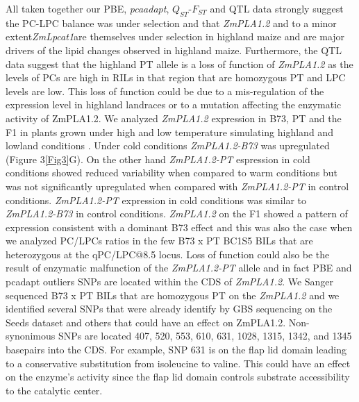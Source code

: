 \documentclass[9pt,twocolumn,twoside]{BioRxiv}
\begin{document}
All taken together our PBE, \textit{pcaadapt}, $Q_{ST}$-$F_{ST}$ and QTL data strongly suggest the PC-LPC balance was under selection and that \textit{ZmPLA1.2} and to a minor extent\textit{ZmLpcat1}are themselves under selection in highland maize and are major drivers of the lipid changes observed in highland maize. 
Furthermore, the QTL data suggest that the highland PT allele is a loss of function of \textit{ZmPLA1.2} as the levels of PCs are high in RILs in that region that are homozygous PT and LPC levels are low. 
This loss of function could be due to a mis-regulation of the expression level in highland landraces or to a mutation affecting the enzymatic activity of ZmPLA1.2. 
We analyzed \textit{ZmPLA1.2} expression in B73, PT and the F1 in plants grown under high and low temperature simulating highland and lowland conditions \cite{Crow2020-gene}. 
Under cold conditions \textit{ZmPLA1.2-B73} was upregulated (Figure 3\ref{Fig3}G). 
On the other hand \textit{ZmPLA1.2-PT} espression in cold conditions showed reduced variability when compared to warm conditions but was not significantly upregulated when compared with \textit{ZmPLA1.2-PT} in control conditions.
\textit{ZmPLA1.2-PT} expression in cold conditions was similar to \textit{ZmPLA1.2-B73} in control conditions.
\textit{ZmPLA1.2} on the F1 showed a pattern of expression consistent with a dominant B73 effect and this was also the case when we analyzed PC/LPCs ratios in the few B73 x PT BC1S5 BILs that are heterozygous at the qPC/LPC@8.5 locus. 
Loss of function could also be the result of enzymatic malfunction of the \textit{ZmPLA1.2-PT} allele and in fact PBE and pcadapt outliers SNPs are located within the CDS of \textit{ZmPLA1.2}. 
We Sanger sequenced B73 x PT BILs that are homozygous PT on the \textit{ZmPLA1.2} and we identified several SNPs that were already identify by GBS sequencing on the Seeds dataset and others that could have an effect on ZmPLA1.2. Non-synonimous SNPs are located 407, 520, 553, 610, 631, 1028, 1315, 1342, and 1345 basepairs into the CDS.
For example, SNP 631 is on the flap lid domain leading to a conservative substitution from isoleucine to valine. This could have an effect on the enzyme's activity since the flap lid domain controls substrate accessibility to the catalytic center. 
\end{document}
